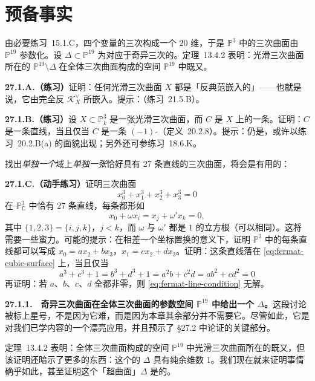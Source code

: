 
\section{预备事实}

由\mbox{必要练习~15.1.C}，四个变量的三次\trForm{}构成一个 $20$ 维\trVectorSpace，于是 $\mathbb{P}^{3}$ 中的三次曲面由 $\mathbb{P}^{19}$ 参数化。设 $\Delta\subset\mathbb{P}^{19}$ 为对应于奇异三次\trHypersurface{}的\trLocus。\mbox{\trBertini{}定理~13.4.2} 表明：光滑三次曲面所在的\trLocus{} $\mathbb{P}^{19}\setminus\Delta$ 在全体三次曲面构成的空间 $\mathbb{P}^{19}$ 中既\trDense{}又\trOpen。

\textbf{27.1.A.（练习）}\quad 证明：任何光滑三次曲面 $X$ 都是「反典范嵌入的」——也就是说，它由完全反\trCanonical\trLinearSystem{} $\mathscr{K}_X^{\vee}$ 所嵌入。提示：\trAdjunctionFormula（\mbox{练习~21.5.B}）。

\textbf{27.1.B.（练习）}\quad 设 $X\subset\mathbb{P}^{3}_{\bar{k}}$ 是一张光滑三次曲面，而 $C$ 是 $X$ 上的一条\trCurve。证明：$C$ 是一条直线，当且仅当 $C$ 是一条 $(-1)$-\trCurve（\mbox{定义~20.2.8}）。提示：仍是\trAdjunctionFormula，或许以\mbox{练习~20.2.B}(a) 的面貌出现；另外还可参\mbox{练习~18.6.K}。

找出\emph{单独一个}域上\emph{单独一张}恰好具有 27 条直线的三次曲面，将会是有用的：

\textbf{27.1.C.（动手练习）}\quad 证明\trFermat{}三次曲面
\[
\tag{27.1.0.1}\label{eq:fermat-cubic-surface}
x_0^{3}+x_1^{3}+x_2^{3}+x_3^{3}=0
\]
在 $\mathbb{P}^{3}_{\mathbb{C}}$ 中恰有 27 条直线，每条都形如
\[
x_0+\omega x_i=x_j+\omega' x_k=0,
\]
其中 $\{1,2,3\}=\{i,j,k\}$，$j<k$，而 $\omega$ 与 $\omega'$ 都是 $1$ 的立方根（可以相同）。这将需要一些蛮力。可能的提示：在相差一个坐标置换的意义下，证明 $\mathbb{P}^{3}$ 中的每条直线都可以写成 $x_0=ax_2+bx_3$，$x_1=cx_2+dx_3$。证明：这条直线落在 \eqref{eq:fermat-cubic-surface} 上，当且仅当
\[
\tag{27.1.0.2}\label{eq:fermat-line-condition}
a^{3}+c^{3}+1=b^{3}+d^{3}+1=a^{2}b+c^{2}d=ab^{2}+cd^{2}=0
\]
再证明：若 $a$、$b$、$c$、$d$ 全都非零，则 \eqref{eq:fermat-line-condition} 无解。

\textbf{27.1.1.}\ \hard\ \textbf{奇异三次曲面在全体三次曲面的参数空间 $\mathbb{P}^{19}$ 中给出一个\trIrreducible\trDivisor{} $\Delta$。}\quad 这段讨论被标上星号，不是因为它难，而是因为本章其余部分并不需要它。尽管如此，它是对我们已学内容的一个漂亮应用，并且预示了 \S27.2 中论证的关键部分。

\mbox{\trBertini{}定理~13.4.2} 表明：全体三次曲面构成的空间 $\mathbb{P}^{19}$ 中光滑三次曲面所在的\trLocus{}既\trDense{}又\trOpen，但该证明还暗示了更多的东西：这个\trLocus{}的\trComplement{} $\Delta$ 具有纯余维数 $1$。我们现在就来证明事情确乎如此，甚至证明这个「\trDiscriminant{}超曲面」$\Delta$ 是\trIrreducible{}的。

